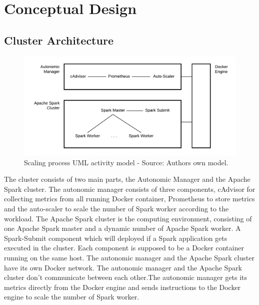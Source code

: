 \chapter{Conceptual Design}
\label{sec:design}
%


\section{Cluster Architecture}

\begin{figure}[h]%
\centering
\includegraphics[scale=0.8]{images/04_conceptual_design/cluster_architecture/overall_architecture}%
\caption{Scaling process UML activity model - Source: Authors own model.}%
\label{fig:ca-overall_architecture}%
\end{figure}

The cluster consists of two main parts, the Autonomic Manager and the Apache Spark cluster. The autonomic manager consists of three components, cAdvisor for collecting metrics from all running Docker container, Prometheus to store metrics and the auto-scaler to scale the number of Spark worker according to the workload.
The Apache Spark cluster is the computing environment, consisting of one Apache Spark master and a dynamic number of Apache Spark worker. A Spark-Submit component which will deployed if a Spark application gets executed in the cluster.
Each component is supposed to be a Docker container running on the same host. The autonomic manager and the Apache Spark cluster have its own Docker network.
The autonomic manager and the Apache Spark cluster don't communicate between each other.The autonomic manager gets its metrics directly from the Docker engine and sends instructions to the Docker engine to scale the number of Spark worker.


